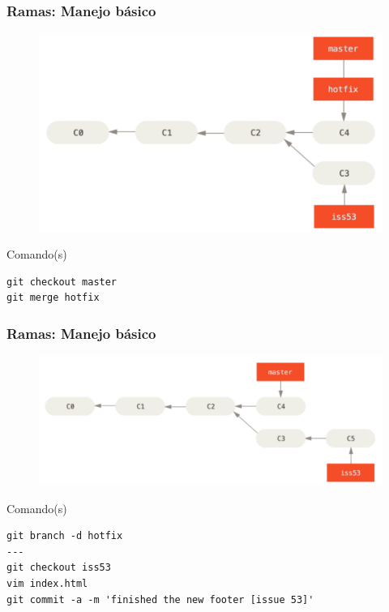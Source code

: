 \documentclass{beamer}
\begin{document}
\begin{frame}[fragile]
\frametitle{Ramas: Manejo básico}
\begin{figure}
\includegraphics[width=0.70\linewidth]{img/branching-5.png}
\end{figure}
\vskip 0.30cm
\footnotesize
\begin{block}{Comando(s)}
\begin{verbatim}
git checkout master
git merge hotfix
\end{verbatim}
\end{block}
\end{frame}

\begin{frame}[fragile]
\frametitle{Ramas: Manejo básico}
\begin{figure}
\includegraphics[width=0.85\linewidth]{img/branching-6.png}
\end{figure}
\vskip 0.30cm
\footnotesize
\begin{block}{Comando(s)}
\begin{verbatim}
git branch -d hotfix
---
git checkout iss53
vim index.html
git commit -a -m 'finished the new footer [issue 53]'
\end{verbatim}
\end{block}
\end{frame}
\end{document}
